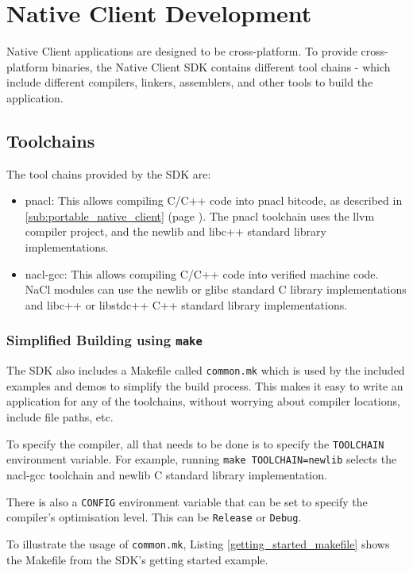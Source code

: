 \section{Native Client Development} %
\label{sec:native_client_development}
Native Client applications are designed to be cross-platform. To provide cross-platform binaries, the Native Client SDK contains different tool chains - which include different compilers, linkers, assemblers, and other tools to build the application.

\subsection{Toolchains} %
\label{sub:toolchains}
The tool chains provided by the SDK are:
\begin{itemize}
	\item pnacl: This allows compiling C/C++ code into pnacl bitcode, as described in \ref{sub:portable_native_client} (page \pageref{sub:portable_native_client}). The pnacl toolchain uses the llvm compiler project, and the newlib and libc++ standard library implementations.
	\item nacl-gcc: This allows compiling C/C++ code into verified machine code. NaCl modules can use the newlib or glibc standard C library implementations and libc++ or libstdc++ C++ standard library implementations.
\end{itemize}

\subsubsection{Simplified Building using \lstinline+make+} %
\label{ssub:building}
The SDK also includes a Makefile called \lstinline+common.mk+ which is used by the included examples and demos to simplify the build process. This makes it easy to write an application for any of the toolchains, without worrying about compiler locations, include file paths, etc.

To specify the compiler, all that needs to be done is to specify the \lstinline+TOOLCHAIN+ environment variable. For example, running \lstinline+make TOOLCHAIN=newlib+ selects the nacl-gcc toolchain and newlib C standard library implementation.

There is also a \lstinline+CONFIG+ environment variable that can be set to specify the compiler's optimisation level. This can be \lstinline+Release+ or \lstinline+Debug+.

To illustrate the usage of \lstinline+common.mk+, Listing \ref{getting_started_makefile} shows the Makefile from the SDK's getting started example.

